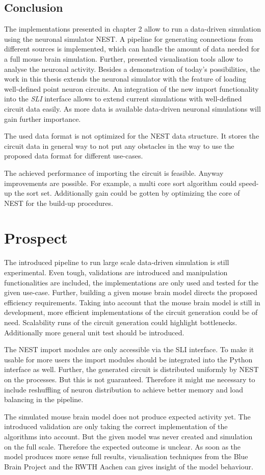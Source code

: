 \subsection{Conclusion}
The implementations presented in chapter 2 allow to run a data-driven simulation using the neuronal simulator NEST.
A pipeline for generating connections from different sources is implemented, which can handle the amount of data needed for 
a full mouse brain simulation. Further, presented visualisation tools allow to analyse the neuronal activity.
Besides a demonstration of today's possibilities, the work in this thesis extends the neuronal simulator with the feature of loading well-defined
point neuron circuits. An integration of the new import functionality into the \emph{SLI}
interface allows to extend current simulations with well-defined circuit data easily.
As more data is available data-driven neuronal simulations will gain further importance.

The used data format is not optimized for the NEST data structure. It stores the circuit data in general way 
to not put any obstacles in the way to use the proposed data format for different use-cases.

The achieved performance of importing the circuit is feasible. Anyway improvements are possible.
For example, a multi core sort algorithm could speed-up the sort set.
Additionally gain could be gotten by optimizing the core of NEST for the build-up procedures.

\section{Prospect}
The introduced pipeline to run large scale data-driven simulation is still experimental.
Even tough, validations are introduced and manipulation functionalities are included, the 
implementations are only used and tested for the given use-case. Further, building a given 
mouse brain model directs the proposed efficiency requirements. Taking into account that
the mouse brain model is still in development, more efficient implementations of the 
circuit generation could be of need. Scalability runs of the circuit generation could
highlight bottlenecks. Additionally more general unit test should be introduced.

The NEST import modules are only accessible via the SLI interface.
To make it usable for more users the import modules should be integrated into the Python
interface as well. Further, the generated circuit is distributed uniformly by NEST on the processes. But this is not guaranteed. Therefore it might me necessary to include reshuffling of neuron distribution to achieve better memory and load balancing in the pipeline.

The simulated mouse brain model does not produce expected activity yet.
The introduced validation are only taking the correct implementation of the algorithms into account.
But the given model was never created and simulation on the full scale. Therefore the expected outcome is unclear. As soon as the model produces more sense full results, visualisation techniques from the
Blue Brain Project and the RWTH Aachen can gives insight of the model behaviour.

